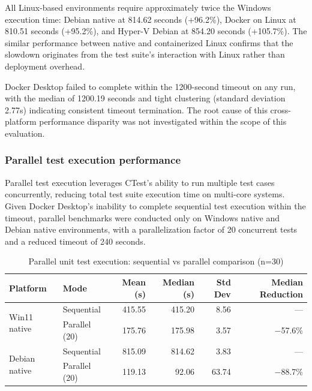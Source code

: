 All Linux-based environments require approximately twice the Windows execution time: Debian native at 814.62 seconds (+96.2\%), Docker on Linux at 810.51 seconds (+95.2\%), and Hyper-V Debian at 854.20 seconds (+105.7\%).
The similar performance between native and containerized Linux confirms that the slowdown originates from the test suite's interaction with Linux rather than deployment overhead.

Docker Desktop failed to complete within the 1200-second timeout on any run, with the median of 1200.19 seconds and tight clustering (standard deviation 2.77s) indicating consistent timeout termination.
The root cause of this cross-platform performance disparity was not investigated within the scope of this evaluation.

\subsubsection{Parallel test execution performance}

Parallel test execution leverages CTest's ability to run multiple test cases concurrently, reducing total test suite execution time on multi-core systems.
Given Docker Desktop's inability to complete sequential test execution within the timeout, parallel benchmarks were conducted only on Windows native and Debian native environments, with a parallelization factor of 20 concurrent tests and a reduced timeout of 240 seconds.

\begin{table}[ht]
    \centering
    \footnotesize
    \begin{tabular}{|l|l|r|r|r|r|}
        \hline
        \textbf{Platform} & \textbf{Mode} & \textbf{Mean (s)} & \textbf{Median (s)} & \textbf{Std Dev} & \textbf{Median Reduction} \\
        \hline
        \multirow{2}{*}{Win11 native} & Sequential & 415.55 & 415.20 & 8.56 & --- \\
        & Parallel (20) & 175.76 & 175.98 & 3.57 & $-$57.6\% \\
        \hline
        \multirow{2}{*}{Debian native} & Sequential & 815.09 & 814.62 & 3.83 & --- \\
        & Parallel (20) & 119.13 & 92.06 & 63.74 & $-$88.7\% \\
        \hline
    \end{tabular}
    \caption{Parallel unit test execution: sequential vs parallel comparison (n=30)}
    \label{tab:unit_tests_parallel_s2}
\end{table}

